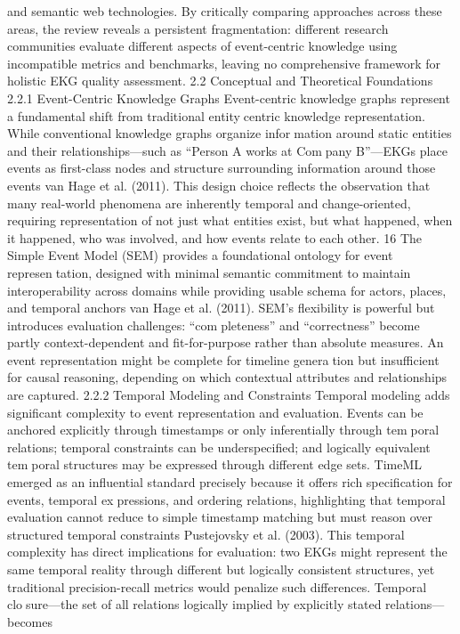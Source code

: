 and semantic web technologies. By critically comparing approaches across these areas,
the review reveals a persistent fragmentation: different research communities evaluate
different aspects of event-centric knowledge using incompatible metrics and benchmarks,
leaving no comprehensive framework for holistic EKG quality assessment.
2.2 Conceptual and Theoretical Foundations
2.2.1 Event-Centric Knowledge Graphs
Event-centric knowledge graphs represent a fundamental shift from traditional entitycentric knowledge representation. While conventional knowledge graphs organize information around static entities and their relationships—such as “Person A works at Company B”—EKGs place events as first-class nodes and structure surrounding information
around those events van Hage et al. (2011). This design choice reflects the observation
that many real-world phenomena are inherently temporal and change-oriented, requiring
representation of not just what entities exist, but what happened, when it happened, who
was involved, and how events relate to each other.
16
The Simple Event Model (SEM) provides a foundational ontology for event representation, designed with minimal semantic commitment to maintain interoperability across
domains while providing usable schema for actors, places, and temporal anchors van Hage
et al. (2011). SEM’s flexibility is powerful but introduces evaluation challenges: “completeness” and “correctness” become partly context-dependent and fit-for-purpose rather
than absolute measures. An event representation might be complete for timeline generation but insufficient for causal reasoning, depending on which contextual attributes and
relationships are captured.
2.2.2 Temporal Modeling and Constraints
Temporal modeling adds significant complexity to event representation and evaluation.
Events can be anchored explicitly through timestamps or only inferentially through temporal relations; temporal constraints can be underspecified; and logically equivalent temporal structures may be expressed through different edge sets. TimeML emerged as an
influential standard precisely because it offers rich specification for events, temporal expressions, and ordering relations, highlighting that temporal evaluation cannot reduce
to simple timestamp matching but must reason over structured temporal constraints
Pustejovsky et al. (2003).
This temporal complexity has direct implications for evaluation: two EKGs might
represent the same temporal reality through different but logically consistent structures,
yet traditional precision-recall metrics would penalize such differences. Temporal closure—the set of all relations logically implied by explicitly stated relations—becomes
